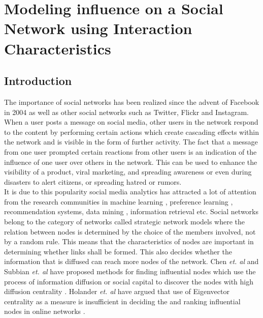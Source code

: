 
\chapter{Modeling influence on a Social Network using Interaction Characteristics}


\section{Introduction}
The importance of social networks has been realized since the advent of Facebook in 2004 as well as other social networks such as Twitter, Flickr and Instagram. When a user posts a message on social media, other users in the network respond to the content by performing certain actions which create cascading effects within the network and is visible in the form of further activity. The fact that a message from one user prompted certain reactions from other users is an indication of the influence of one user over others in the network. This can be used to enhance the visibility of a product, viral marketing, and spreading awareness or even during disasters to alert citizens, or spreading hatred or rumors. \\

It is due to this popularity social media analytics has attracted a lot of attention from the research communities in machine learning \cite{aps:1} \cite{aps:8} \cite{aps:4}, preference learning \cite{aps:9}, recommendation systems, data mining \cite{aps:10}, information retrieval \cite{aps:11} etc. Social networks belong to the category of networks called strategic network models where the relation between nodes is determined by the choice of the members involved, not by a random rule. This means that the characteristics of nodes are important in determining whether links shall be formed. This also decides whether the information that is diffused can reach more nodes of the network. Chen \textit{et. al} and Subbian \textit{et. al} have proposed methods for finding influential nodes which use the process of information diffusion or social capital to discover the nodes with high diffusion centrality \cite{aps:12} \cite{aps:13}. Holander \textit{et. al} have argued that use of Eigenvector centrality as a measure is insufficient in deciding the and ranking influential nodes in online networks \cite{aps:15} \cite{aps:14}. \\

